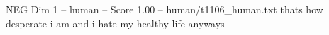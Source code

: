 \begin{textsample}{NEG Dim 1 – human – Score 1.00 – human/t1106\_human.txt}  \label{ex:f1_neg_010}
thats how desperate i am and i hate my healthy life anyways

\end{textsample}
